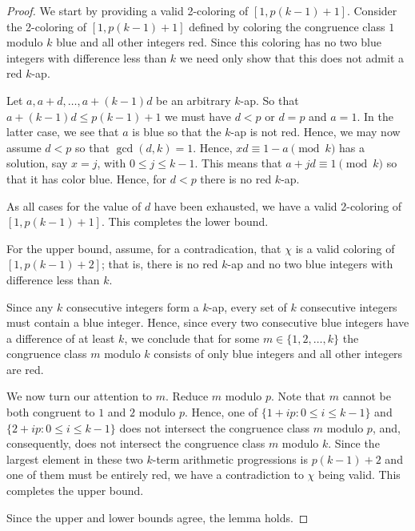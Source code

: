 \documentclass[10pt,a4paper]{amsart}
\begin{document}
\begin{proof} We start by providing a valid 2-coloring of $[1,p(k-1)+1]$.
Consider the 2-coloring of $[1,p(k-1)+1]$ defined by coloring the congruence class $1$ modulo $k$
blue and all other integers red.  Since this coloring has no two   blue
integers with difference less than $k$ we need only show that this does not admit a red $k$-ap.  

Let
$a,a+d,\dots,a+(k-1)d$ be an arbitrary $k$-ap.  So that $a+(k-1)d \leq p(k-1)+1$ we must have $d < p$ or $d=p$ and $a=1$.
In the latter case, we see that $a$ is blue so that the $k$-ap is not red.  Hence, we may now assume $d<p$
so that $\gcd(d,k)=1$.  Hence, $xd \equiv 1-a \pmod{k}$ has a solution, say $x=j$,
with $0 \leq j \leq k-1$.  This means that $a+jd \equiv 1 \pmod{k}$ so that it has color blue.  Hence, for $d<p$ there
is no red $k$-ap.  

As all cases for the value of $d$ have been exhausted, we have a valid 2-coloring of $[1,p(k-1)+1]$.
This completes the lower bound.

For the upper bound, assume, for a contradication, that $\chi$ is a valid coloring of $[1,p(k-1)+2]$; that is, 
there is no red $k$-ap and no two blue integers
with difference less than $k$.  

Since any $k$ consecutive integers form a $k$-ap, every set of
$k$ consecutive integers must contain a blue integer.  
Hence, since every two consecutive blue
integers have a difference of at least $k$, we conclude that for some $m \in \{1,2,\dots,k\}$ the congruence
class $m$ modulo $k$ consists of only blue integers and all other integers are red.  

We now turn our attention to $m$.  Reduce $m$ modulo $p$.  Note that $m$ cannot be both
congruent to $1$ and $2$ modulo $p$.  Hence, one of $\{1+ip: 0 \leq i \leq k-1\}$
and $\{2+ip: 0 \leq i \leq k-1\}$ does not intersect the congruence class $m$ modulo $p$, and,
consequently, does not intersect the congruence class $m$ modulo $k$.
Since the largest element in these two $k$-term arithmetic progressions is $p(k-1)+2$ and
one of them must be entirely red, we have a contradiction to $\chi$ being valid.
This completes the upper bound.

Since the upper and lower bounds agree, the lemma holds.
\end{proof}
\end{document}
